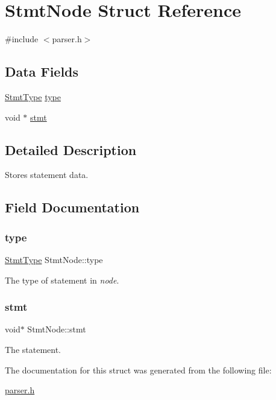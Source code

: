 \hypertarget{struct_stmt_node}{}\section{Stmt\+Node Struct Reference}
\label{struct_stmt_node}


{\ttfamily \#include $<$parser.\+h$>$}

\subsection*{Data Fields}
\begin{DoxyCompactItemize}
\item 
\hyperlink{parser_8h_a9c1bfaf3c0a28d12826afa7bd1b0a3db}{Stmt\+Type} \hyperlink{struct_stmt_node_a1a1a8ff13773a99c9344f5392cabfa13}{type}
\item 
void $\ast$ \hyperlink{struct_stmt_node_abe2bb8927d8a9a26b83d855fb14837e6}{stmt}
\end{DoxyCompactItemize}


\subsection{Detailed Description}
Stores statement data. 

\subsection{Field Documentation}
\mbox{\label{struct_stmt_node_a1a1a8ff13773a99c9344f5392cabfa13}} 
\subsubsection{\texorpdfstring{type}{type}}
{\footnotesize\ttfamily \hyperlink{parser_8h_a9c1bfaf3c0a28d12826afa7bd1b0a3db}{Stmt\+Type} Stmt\+Node\+::type}

The type of statement in {\itshape node}. \mbox{\label{struct_stmt_node_abe2bb8927d8a9a26b83d855fb14837e6}} 
\subsubsection{\texorpdfstring{stmt}{stmt}}
{\footnotesize\ttfamily void$\ast$ Stmt\+Node\+::stmt}

The statement. 

The documentation for this struct was generated from the following file\+:\begin{DoxyCompactItemize}
\item 
\hyperlink{parser_8h}{parser.\+h}\end{DoxyCompactItemize}
